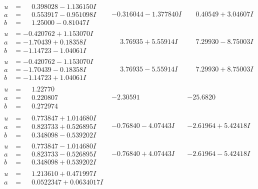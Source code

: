 \documentclass[1p]{elsarticle_modified}
\theoremstyle{definition}
\begin{document}
$$\begin{array}{c|c|c}
\begin{aligned}
u &= \phantom{-}0.398028 - 1.136150 I \\
a &= \phantom{-}0.553917 - 0.951098 I \\
b &= \phantom{-}1.25000 - 0.81047 I\end{aligned}
 & -0.316044 - 1.377840 I & \phantom{-}0.40549 + 3.04607 I \\ \hline\begin{aligned}
u &= -0.420762 + 1.153070 I \\
a &= -1.70439 + 0.18358 I \\
b &= -1.14723 - 1.04061 I\end{aligned}
 & \phantom{-}3.76935 + 5.55914 I & \phantom{-}7.29930 - 8.75003 I \\ \hline\begin{aligned}
u &= -0.420762 - 1.153070 I \\
a &= -1.70439 - 0.18358 I \\
b &= -1.14723 + 1.04061 I\end{aligned}
 & \phantom{-}3.76935 - 5.55914 I & \phantom{-}7.29930 + 8.75003 I \\ \hline\begin{aligned}
u &= \phantom{-}1.22770\phantom{ +0.000000I} \\
a &= \phantom{-}0.220807\phantom{ +0.000000I} \\
b &= \phantom{-}0.272974\phantom{ +0.000000I}\end{aligned}
 & -2.30591\phantom{ +0.000000I} & -25.6820\phantom{ +0.000000I} \\ \hline\begin{aligned}
u &= \phantom{-}0.773847 + 1.014680 I \\
a &= \phantom{-}0.823733 + 0.526895 I \\
b &= \phantom{-}0.348098 - 0.539202 I\end{aligned}
 & -0.76840 - 4.07443 I & -2.61964 + 5.42418 I \\ \hline\begin{aligned}
u &= \phantom{-}0.773847 - 1.014680 I \\
a &= \phantom{-}0.823733 - 0.526895 I \\
b &= \phantom{-}0.348098 + 0.539202 I\end{aligned}
 & -0.76840 + 4.07443 I & -2.61964 - 5.42418 I \\ \hline\begin{aligned}
u &= \phantom{-}1.213610 + 0.471997 I \\
a &= \phantom{-}0.0522347 + 0.0634017 I \\

\end{aligned}
\end{array}$$
\end{document}
